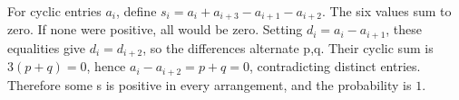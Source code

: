 For cyclic entries $a_i$, define $s_i=a_i+a_{i+3}-a_{i+1}-a_{i+2}$. The six values sum to zero. If none were positive, all would be zero. Setting $d_i=a_i-a_{i+1}$, these equalities give $d_i=d_{i+2}$, so the differences alternate p,q. Their cyclic sum is $3(p+q)=0$, hence $a_i-a_{i+2}=p+q=0$, contradicting distinct entries. Therefore some s is positive in every arrangement, and the probability is $\boxed1$.
